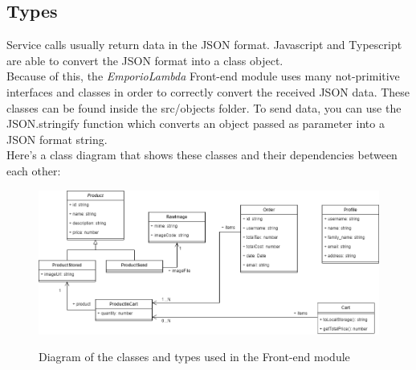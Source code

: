 \subsection{Types}
Service calls usually return data in the JSON format. Javascript and Typescript are able to convert the JSON format into a class object.\\
Because of this, the \textit{EmporioLambda} Front-end module uses many not-primitive interfaces and classes in order to correctly convert the received JSON data. These classes can be found inside the src/objects folder. To send data, you can use the JSON.stringify function which converts an object passed as parameter into a JSON format string. \\ Here's a class diagram that shows these classes and their dependencies between each other:
\vspace{0.5cm}
\begin{figure}[H]
\centering
\includegraphics[scale=0.45]{res/Architettura/Frontend/img/class_frontend_types}\\
\caption{Diagram of the classes and types used in the Front-end module}
\end{figure}